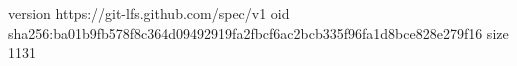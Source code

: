 version https://git-lfs.github.com/spec/v1
oid sha256:ba01b9fb578f8c364d09492919fa2fbcf6ac2bcb335f96fa1d8bce828e279f16
size 1131
